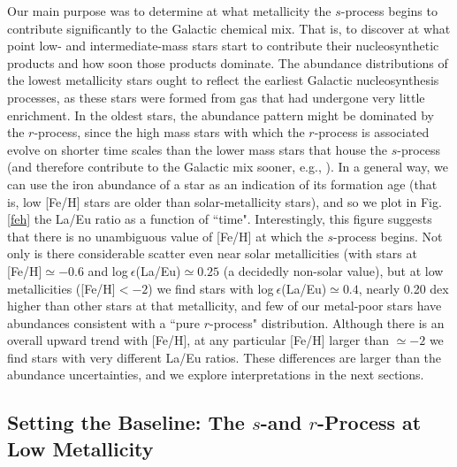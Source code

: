 \documentclass[12pt,preprint]{aastex}
\begin{document}
{Our main purpose was to determine at what metallicity the $s$-process begins to contribute significantly to the Galactic chemical mix.  That is, to discover at what point low- and intermediate-mass stars start to contribute their nucleosynthetic products and how soon those products dominate.   The abundance distributions of the lowest metallicity stars ought to reflect the earliest Galactic nucleosynthesis processes, as these stars were formed from gas that had undergone very little enrichment.  In the oldest stars, the abundance pattern might be dominated by the $r$-process, since the high mass stars with which the $r$-process is associated evolve on shorter time scales than the lower mass stars that house the $s$-process (and therefore contribute to the Galactic mix sooner, e.g., \citealt{Truran1981}).  In a general way, we can use the iron abundance of a star as an indication of its formation age (that is, low [Fe/H] stars are older than solar-metallicity stars), and so we plot in Fig. \ref{feh} the La/Eu ratio as a function of ``time".  Interestingly, this figure suggests that there is no unambiguous value of [Fe/H] at which the $s$-process begins.  Not only is there considerable scatter even near solar metallicities (with stars at [Fe/H]$\simeq -0.6$ and log$~\epsilon$(La/Eu)$\simeq 0.25$ (a decidedly non-solar value), but at low metallicities ([Fe/H]$<-2$) we find stars with log$~\epsilon$(La/Eu)$\simeq 0.4$, nearly 0.20 dex higher than other stars at that metallicity, and few of our metal-poor stars have abundances  consistent with a ``pure $r$-process" distribution.  Although there is an overall upward trend with [Fe/H], at any particular [Fe/H] larger than $\simeq -2$ we find stars with very different La/Eu ratios.  These differences are larger than the abundance uncertainties, and we explore interpretations in the next sections. 

 \subsection{Setting the Baseline: The $s$-and $r$-Process at Low Metallicity}

}
\end{document}
